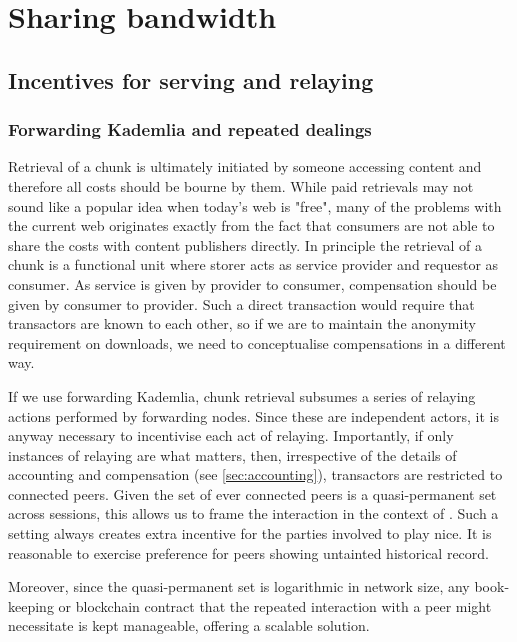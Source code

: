 \section{Sharing bandwidth}

\subsection{Incentives for serving and relaying}\label{sec:incentives-relaying}

\subsubsection{Forwarding Kademlia and repeated dealings}

Retrieval of a chunk is ultimately initiated by someone accessing content and therefore all costs should be bourne by them. While paid retrievals may not sound like a popular idea when today's web is "free", many of the problems with the current web originates exactly from the fact that consumers are not able to share the costs with content publishers directly. In principle the retrieval of a chunk is a functional unit where storer acts as service provider and requestor as consumer. As service is given by provider to consumer, compensation should be given by consumer to provider. Such a direct transaction would require that transactors are known to each other, so if we are to maintain the anonymity requirement on  downloads, we need to conceptualise compensations in a different way. 

If we use forwarding Kademlia, chunk retrieval subsumes a series of relaying actions performed by forwarding nodes. Since these are independent actors, it is anyway necessary to incentivise each act of relaying. Importantly, if only instances of relaying are what matters, then, irrespective of the details of accounting and compensation (see \ref{sec:accounting}), transactors are restricted to connected peers. Given the set of ever connected peers is a quasi-permanent set across sessions, this allows us to frame the interaction in the context of . Such a setting always creates extra incentive for the parties involved to play nice. It is reasonable to exercise preference for peers showing untainted historical record. 

Moreover, since the quasi-permanent set is logarithmic in network size, any book-keeping or blockchain contract that the repeated interaction with a peer might necessitate is kept manageable, offering a scalable solution.

